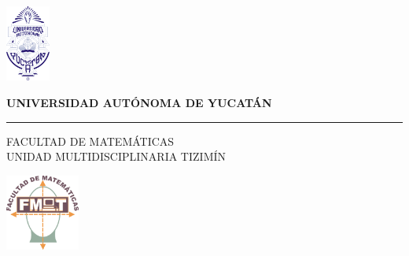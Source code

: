 \documentclass[12pt]{article}
\begin{document}
	
	\thispagestyle{empty}
	\hskip-2.15cm
	\begin{minipage}[c][1\totalheight][s]{3.5cm} 
		\begin{center}
			\includegraphics[height=2.5cm]{img/uady.png}\\[10pt]
		\end{center}
	\end{minipage}\begin{minipage}[c][1\totalheight][s]{12cm} 
		\begin{center}
			{\selectfont\Large\textbf {UNIVERSIDAD AUTÓNOMA DE YUCATÁN}}
			\vspace{0.3cm}
			\hrule height1.5pt
			\vspace{.3cm}
			{{\selectfont FACULTAD DE MATEMÁTICAS\\UNIDAD MULTIDISCIPLINARIA TIZIMÍN}}
		\end{center}
	\end{minipage}\begin{minipage}[c][1\totalheight][s]{3cm} 
		\begin{center}
			\includegraphics[height=2.5cm]{img/matem.png}\\[10pt]
		\end{center}
	\end{minipage}\quad
	\vspace{.01cm}
	
\end{document}
